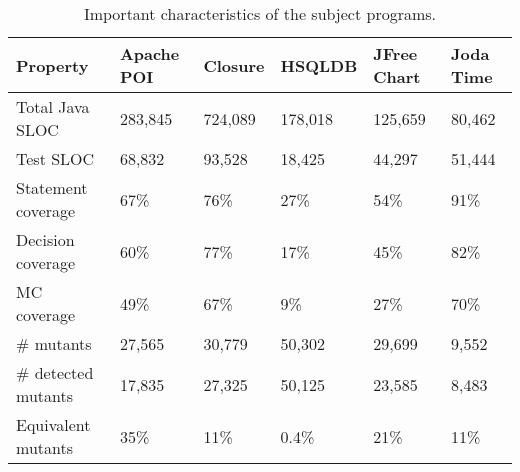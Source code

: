 \begin{table}
\begin{center}
\caption{Important characteristics of the subject programs.}
 \begin{tabular}{p{2.5cm} p{.8cm} p{.8cm} p{1.1cm} p{.8cm} p{.7cm}}
 \hline
 \textbf{Property} & \textbf{Apache POI} & \textbf{Closure} & \textbf{HSQLDB} & \textbf{JFree Chart} & \textbf{Joda Time}\\[0.5ex] 
 \hline
 Total Java SLOC & 283,845 & 724,089 & 178,018 & 125,659 & 80,462 \\ 

 Test SLOC & 68,832 & 93,528 & 18,425 & 44,297 & 51,444 \\
 
 Statement coverage & 67\% & 76\% & 27\% & 54\% & 91\%\\
 
 Decision coverage & 60\% & 77\% & 17\% & 45\% & 82\%\\
 
 MC coverage & 49\% & 67\% & 9\% & 27\% & 70\%\\ [1ex] 
 \hline
 \# mutants & 27,565 & 30,779 & 50,302 & 29,699 & 9,552\\
 \# detected mutants & 17,835 & 27,325 & 50,125 & 23,585 & 8,483\\
 Equivalent mutants & 35\% & 11\% & 0.4\% & 21\% & 11\%\\[1ex]
 \hline
\end{tabular}
\end{center}
\end{table}